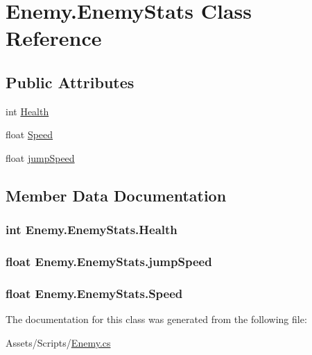 \hypertarget{class_enemy_1_1_enemy_stats}{}\section{Enemy.\+Enemy\+Stats Class Reference}
\label{class_enemy_1_1_enemy_stats}
\subsection*{Public Attributes}
\begin{DoxyCompactItemize}
\item 
int \hyperlink{class_enemy_1_1_enemy_stats_a91ec5fc7758b9a93cc3927ec77316c09}{Health}
\item 
float \hyperlink{class_enemy_1_1_enemy_stats_af8efec65edabf6aa61a4de121a7cf153}{Speed}
\item 
float \hyperlink{class_enemy_1_1_enemy_stats_a105a48a695ac24f35eaa6fc4bf34fcd0}{jump\+Speed}
\end{DoxyCompactItemize}


\subsection{Member Data Documentation}
\hypertarget{class_enemy_1_1_enemy_stats_a91ec5fc7758b9a93cc3927ec77316c09}{}
\subsubsection[{Health}]{\setlength{\rightskip}{0pt plus 5cm}int Enemy.\+Enemy\+Stats.\+Health}\label{class_enemy_1_1_enemy_stats_a91ec5fc7758b9a93cc3927ec77316c09}
\hypertarget{class_enemy_1_1_enemy_stats_a105a48a695ac24f35eaa6fc4bf34fcd0}{}
\subsubsection[{jump\+Speed}]{\setlength{\rightskip}{0pt plus 5cm}float Enemy.\+Enemy\+Stats.\+jump\+Speed}\label{class_enemy_1_1_enemy_stats_a105a48a695ac24f35eaa6fc4bf34fcd0}
\hypertarget{class_enemy_1_1_enemy_stats_af8efec65edabf6aa61a4de121a7cf153}{}
\subsubsection[{Speed}]{\setlength{\rightskip}{0pt plus 5cm}float Enemy.\+Enemy\+Stats.\+Speed}\label{class_enemy_1_1_enemy_stats_af8efec65edabf6aa61a4de121a7cf153}


The documentation for this class was generated from the following file\+:\begin{DoxyCompactItemize}
\item 
Assets/\+Scripts/\hyperlink{_enemy_8cs}{Enemy.\+cs}\end{DoxyCompactItemize}
